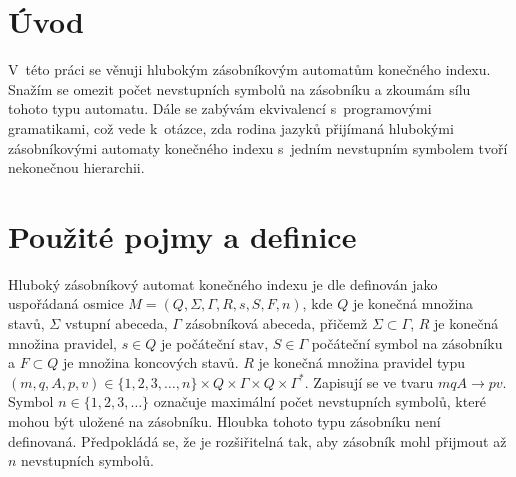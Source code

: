 

\chapter{Úvod}

V~této práci se věnuji hlubokým zásobníkovým automatům konečného indexu. Snažím se omezit počet nevstupních symbolů na zásobníku a zkoumám sílu tohoto typu automatu.
Dále se zabývám ekvivalencí s~programovými gramatikami, což vede k~otázce, zda rodina jazyků přijímaná hlubokými zásobníkovými automaty konečného indexu s~jedním nevstupním 
symbolem tvoří nekonečnou hierarchii. 






\chapter{Použité pojmy a definice}

\begin{Def} Hluboký zásobníkový automat konečného indexu je dle \cite{Meduna:DeepPDA} definován jako uspořádaná osmice $M = (Q,\Sigma,\Gamma, R, s, S, F, n)$, 
kde $Q$ je konečná množina stavů, $\Sigma$ vstupní abeceda, $\Gamma$ zásobníková abeceda, přičemž $\Sigma \subset \Gamma$,
$R$ je konečná množina pravidel, $s \in Q$ je počáteční stav, $S \in \Gamma$ počáteční symbol na zásobníku a $F \subset Q$ je množina
koncových stavů. $R$ je konečná množina pravidel typu $(m, q, A, p, v) \in \{1,2,3,\dots,n\} \times Q \times \Gamma \times Q \times {\Gamma}^*$. Zapisují se ve tvaru $mqA \rightarrow pv$. Symbol $n \in \{1,2,3,\dots\}$ označuje maximální počet nevstupních symbolů, které mohou být uložené na zásobníku.
Hloubka tohoto typu zásobníku není definovaná. Předpokládá se, že je rozšiřitelná tak, aby zásobník mohl přijmout až $n$ nevstupních symbolů.
\end{Def}


